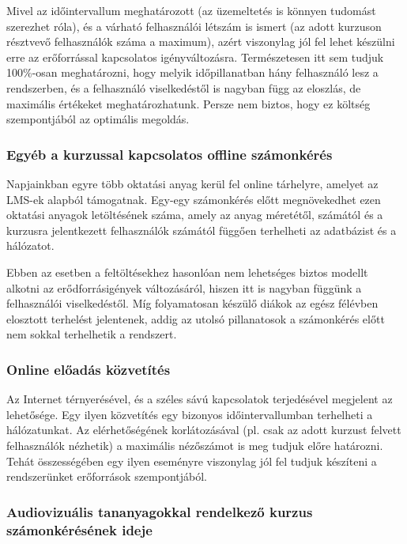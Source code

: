 Mivel az időintervallum meghatározott (az üzemeltetés is könnyen tudomást szerezhet róla), és a várható felhasználói létszám is ismert (az adott kurzuson résztvevő felhasználók száma a maximum), azért viszonylag jól fel lehet készülni erre az erőforrással kapcsolatos igényváltozásra. Természetesen itt sem tudjuk 100\%-osan meghatározni, hogy melyik időpillanatban hány felhasználó lesz a rendszerben, és a felhasználó viselkedéstől is nagyban függ az eloszlás, de maximális értékeket meghatározhatunk. Persze nem biztos, hogy ez költség szempontjából az optimális megoldás.

\subsubsection{Egyéb a kurzussal kapcsolatos offline számonkérés}

Napjainkban egyre több oktatási anyag kerül fel online tárhelyre, amelyet az LMS-ek alapból támogatnak. Egy-egy számonkérés előtt megnövekedhet ezen oktatási anyagok letöltésének száma, amely az anyag méretétől, számától és a kurzusra jelentkezett felhasználók számától függően terhelheti az adatbázist és a hálózatot.

Ebben az esetben a feltöltésekhez hasonlóan nem lehetséges biztos modellt alkotni az erődforrásigények változásáról, hiszen itt is nagyban függünk a felhasználói viselkedéstől. Míg folyamatosan készülő diákok az egész félévben elosztott terhelést jelentenek, addig az utolsó pillanatosok a számonkérés előtt nem sokkal terhelhetik a rendszert. 

\subsubsection{Online előadás közvetítés}

Az Internet térnyerésével, és a széles sávú kapcsolatok terjedésével megjelent az  lehetősége. Egy ilyen közvetítés egy bizonyos időintervallumban terhelheti a hálózatunkat. Az elérhetőségének korlátozásával (pl. csak az adott kurzust felvett felhasználók nézhetik) a maximális nézőszámot is meg tudjuk előre határozni. Tehát összességében egy ilyen eseményre viszonylag jól fel tudjuk készíteni a rendszerünket erőforrások szempontjából.  

\subsubsection{Audiovizuális tananyagokkal rendelkező kurzus számonkérésének ideje}


